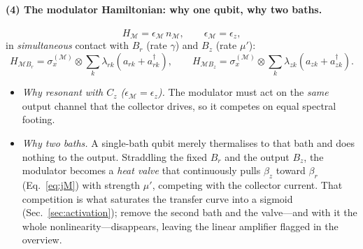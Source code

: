 \documentclass[11pt,a4paper]{article}
\theoremstyle{definition}
\theoremstyle{remark}
\begin{document}
\paragraph{(4) The modulator Hamiltonian: why one qubit, why two baths.}
\begin{equation}
H_\mathcal{M}=\epsilon_\mathcal{M}\,n_\mathcal{M},
\qquad \epsilon_\mathcal{M}=\epsilon_z,
\end{equation}
in \emph{simultaneous} contact with $B_r$ (rate $\gamma$) and $B_z$
(rate $\mu'$):
\begin{equation}
H_{\mathcal{M}B_r}=\sigma_x^{(\mathcal{M})}\!\otimes\!
\sum_k\lambda_{rk}(a_{rk}+a_{rk}^\dagger),
\qquad
H_{\mathcal{M}B_z}=\sigma_x^{(\mathcal{M})}\!\otimes\!
\sum_k\lambda_{zk}(a_{zk}+a_{zk}^\dagger).
\end{equation}
\begin{itemize}
\item \emph{Why resonant with $C_z$ ($\epsilon_\mathcal{M}=\epsilon_z$).}
The modulator must act on the \emph{same} output channel that the
collector drives, so it competes on equal spectral footing.
\item \emph{Why two baths.} A single-bath qubit merely thermalises to
that bath and does nothing to the output. Straddling the fixed $B_r$ and
the output $B_z$, the modulator becomes a \emph{heat valve} that
continuously pulls $\beta_z$ toward $\beta_r$ (Eq.~\eqref{eq:jM}) with
strength $\mu'$, competing with the collector current. That competition
is what saturates the transfer curve into a sigmoid
(Sec.~\ref{sec:activation}); remove the second bath and the valve---and
with it the whole nonlinearity---disappears, leaving the linear
amplifier flagged in the overview.
\end{itemize}
\end{document}

